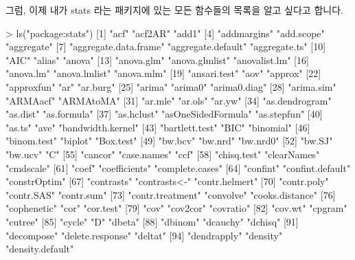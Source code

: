 그럼, 이제 내가 stats 라는 패키지에 있는 모든 함수들의 목록을 알고 싶다고 합니다. 

\begin{Schunk}
\begin{Soutput}
> ls("package:stats")
  [1] "acf"                  "acf2AR"               "add1"                
  [4] "addmargins"           "add.scope"            "aggregate"           
  [7] "aggregate.data.frame" "aggregate.default"    "aggregate.ts"        
 [10] "AIC"                  "alias"                "anova"               
 [13] "anova.glm"            "anova.glmlist"        "anovalist.lm"        
 [16] "anova.lm"             "anova.lmlist"         "anova.mlm"           
 [19] "ansari.test"          "aov"                  "approx"              
 [22] "approxfun"            "ar"                   "ar.burg"             
 [25] "arima"                "arima0"               "arima0.diag"         
 [28] "arima.sim"            "ARMAacf"              "ARMAtoMA"            
 [31] "ar.mle"               "ar.ols"               "ar.yw"               
 [34] "as.dendrogram"        "as.dist"              "as.formula"          
 [37] "as.hclust"            "asOneSidedFormula"    "as.stepfun"          
 [40] "as.ts"                "ave"                  "bandwidth.kernel"    
 [43] "bartlett.test"        "BIC"                  "binomial"            
 [46] "binom.test"           "biplot"               "Box.test"            
 [49] "bw.bcv"               "bw.nrd"               "bw.nrd0"             
 [52] "bw.SJ"                "bw.ucv"               "C"                   
 [55] "cancor"               "case.names"           "ccf"                 
 [58] "chisq.test"           "clearNames"           "cmdscale"            
 [61] "coef"                 "coefficients"         "complete.cases"      
 [64] "confint"              "confint.default"      "constrOptim"         
 [67] "contrasts"            "contrasts<-"          "contr.helmert"       
 [70] "contr.poly"           "contr.SAS"            "contr.sum"           
 [73] "contr.treatment"      "convolve"             "cooks.distance"      
 [76] "cophenetic"           "cor"                  "cor.test"            
 [79] "cov"                  "cov2cor"              "covratio"            
 [82] "cov.wt"               "cpgram"               "cutree"              
 [85] "cycle"                "D"                    "dbeta"               
 [88] "dbinom"               "dcauchy"              "dchisq"              
 [91] "decompose"            "delete.response"      "deltat"              
 [94] "dendrapply"           "density"              "density.default"     

\end{Soutput}
\end{Schunk}
